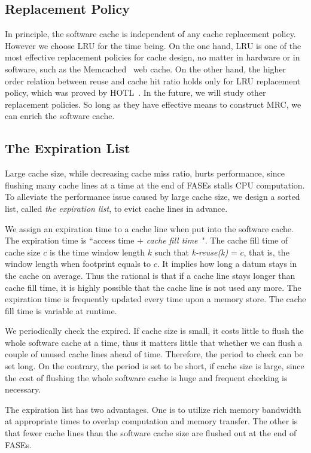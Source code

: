 \documentclass[preprint,nocopyrightspace,10pt]{sigplanconf}
\begin{document}
\subsection{Replacement Policy}
In principle, the software cache is independent of any cache replacement policy. 
However we choose LRU for the time being. On the one hand, LRU is one of the 
most effective replacement policies for cache design, no matter in hardware 
or in software, such as the Memcached~\cite{Fitzpatrick:2004} web cache. On the other hand,
the higher order relation between reuse and cache hit ratio holds only
for LRU replacement policy, which was proved by HOTL~\cite{Xiang+:ASPLOS13}.
In the future, we will study other replacement policies. So long as they have
effective means to construct MRC, we can enrich the software cache.

\subsection{The Expiration List}
\label{sec:exp}
Large cache size, while decreasing cache miss ratio, hurts performance, since
flushing many cache lines at a time at the end of FASEs stalls CPU computation. 
To alleviate the performance issue caused by large cache size, we design a sorted 
list, called \emph{the expiration list},  to evict cache lines in advance.

We assign an expiration time to a cache line when put into the software cache.
The expiration time is ``access time + \emph{cache fill time}~\cite{Xiang+:ASPLOS13}".
The cache fill time of cache size $c$ is the time window length $k$ such that 
\emph{k-reuse(k)} = $c$, that is, the window length when footprint equals to $c$. 
It implies how long a datum stays in the cache on average. Thus the rational
is that if a cache line stays longer than cache fill time, it is highly possible that
the cache line is not used any more. The expiration time is frequently updated
every time upon a memory store. The cache fill time is variable at runtime. 

We periodically check the expired. If cache size is small, it costs little to flush the 
whole software cache at a time, thus it matters little that whether we can flush a 
couple of unused cache lines ahead of time. Therefore, the period to check can be set 
long. On the contrary, the period is set to be short, if cache size is large, since 
the cost of flushing the whole software cache is huge and frequent checking is 
necessary.

The expiration list has two advantages. One is to utilize rich memory bandwidth 
at appropriate times to overlap computation and memory transfer. The other is 
that fewer cache lines than the software cache size are flushed out at the end 
of FASEs.
\end{document}
